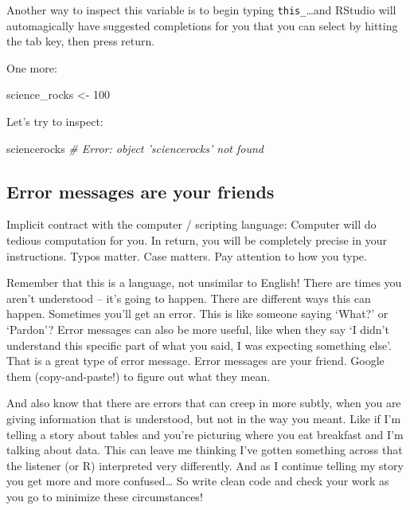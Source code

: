 \documentclass[]{book}
\newenvironment{Shaded}{\begin{snugshade}}{\end{snugshade}}
\newcommand{\DecValTok}[1]{\textcolor[rgb]{0.00,0.00,0.81}{{#1}}}
\newcommand{\StringTok}[1]{\textcolor[rgb]{0.31,0.60,0.02}{{#1}}}
\newcommand{\CommentTok}[1]{\textcolor[rgb]{0.56,0.35,0.01}{\textit{{#1}}}}
\newcommand{\NormalTok}[1]{{#1}}
\theoremstyle{definition}
\theoremstyle{definition}
\theoremstyle{definition}
\theoremstyle{remark}
\begin{document}
Another way to inspect this variable is to begin typing
\texttt{this\_}\ldots{}and RStudio will automagically have suggested
completions for you that you can select by hitting the tab key, then
press return.

One more:

\begin{Shaded}
\begin{Highlighting}[]
\NormalTok{science_rocks <-}\StringTok{ }\DecValTok{100}
\end{Highlighting}
\end{Shaded}

Let's try to inspect:

\begin{Shaded}
\begin{Highlighting}[]
\NormalTok{sciencerocks}
\CommentTok{# Error: object 'sciencerocks' not found}
\end{Highlighting}
\end{Shaded}

\subsection{Error messages are your
friends}\label{error-messages-are-your-friends}

Implicit contract with the computer / scripting language: Computer will
do tedious computation for you. In return, you will be completely
precise in your instructions. Typos matter. Case matters. Pay attention
to how you type.

Remember that this is a language, not unsimilar to English! There are
times you aren't understood -- it's going to happen. There are different
ways this can happen. Sometimes you'll get an error. This is like
someone saying `What?' or `Pardon'? Error messages can also be more
useful, like when they say `I didn't understand this specific part of
what you said, I was expecting something else'. That is a great type of
error message. Error messages are your friend. Google them
(copy-and-paste!) to figure out what they mean.

And also know that there are errors that can creep in more subtly, when
you are giving information that is understood, but not in the way you
meant. Like if I'm telling a story about tables and you're picturing
where you eat breakfast and I'm talking about data. This can leave me
thinking I've gotten something across that the listener (or R)
interpreted very differently. And as I continue telling my story you get
more and more confused\ldots{} So write clean code and check your work
as you go to minimize these circumstances!
\end{document}
